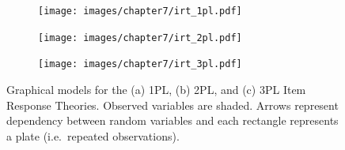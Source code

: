 \begin{figure}
    \centering
    \begin{subfigure}[b]{0.3\textwidth}
        \centering
        \texttt{[image: images/chapter7/irt\_1pl.pdf]}
        \caption{}
    \end{subfigure}
    \begin{subfigure}[b]{0.3\textwidth}
        \centering
        \texttt{[image: images/chapter7/irt\_2pl.pdf]}
        \caption{}
    \end{subfigure}
    \begin{subfigure}[b]{0.3\textwidth}
        \centering
        \texttt{[image: images/chapter7/irt\_3pl.pdf]}
        \caption{}
    \end{subfigure}
    \caption{Graphical models for the (a) 1PL, (b) 2PL, and (c) 3PL Item Response Theories. Observed variables are shaded. Arrows represent dependency between random variables and each rectangle represents a plate (i.e.~repeated observations).}
    \label{fig:irt_graph}
\end{figure}

